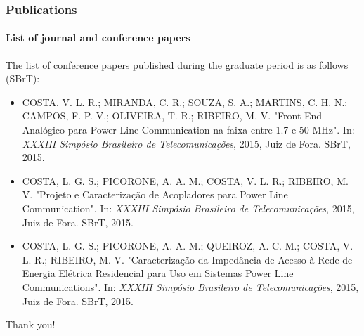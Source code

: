 \documentclass[mathserif]{beamer}
\begin{document}
\begin{frame}
	\frametitle{Publications}
	\framesubtitle{List of journal and conference papers}
	The list of conference papers published during the graduate period is as follows (SBrT):
	\small
	\begin{itemize}
		\item COSTA, V. L. R.; MIRANDA, C. R.; SOUZA, S. A.; MARTINS, C. H. N.; CAMPOS, F. P. V.; OLIVEIRA, T. R.; RIBEIRO, M. V. "Front-End Analógico para Power Line Communication na faixa entre 1.7 e 50 MHz". In: \textit{XXXIII Simpósio Brasileiro de Telecomunicações}, 2015, Juiz de Fora. SBrT, 2015.
		
		\item COSTA, L. G. S.; PICORONE, A. A. M.; COSTA, V. L. R.; RIBEIRO, M. V. "Projeto e Caracterização de Acopladores para Power Line Communication". In: \textit{XXXIII Simpósio Brasileiro de Telecomunicações}, 2015, Juiz de Fora. SBrT, 2015.
		
		\item COSTA, L. G. S.; PICORONE, A. A. M.; QUEIROZ, A. C. M.; COSTA, V. L. R.; RIBEIRO, M. V. "Caracterização da Impedância de Acesso à Rede de Energia Elétrica Residencial para Uso em Sistemas Power Line Communications". In: \textit{XXXIII Simpósio Brasileiro de Telecomunicações}, 2015, Juiz de Fora. SBrT, 2015.
	\end{itemize}
\end{frame}


\begin{frame}[noframenumbering]
	\vfill
	\centering
	\Huge{Thank you!}
	\vfill
\end{frame}
\end{document}
